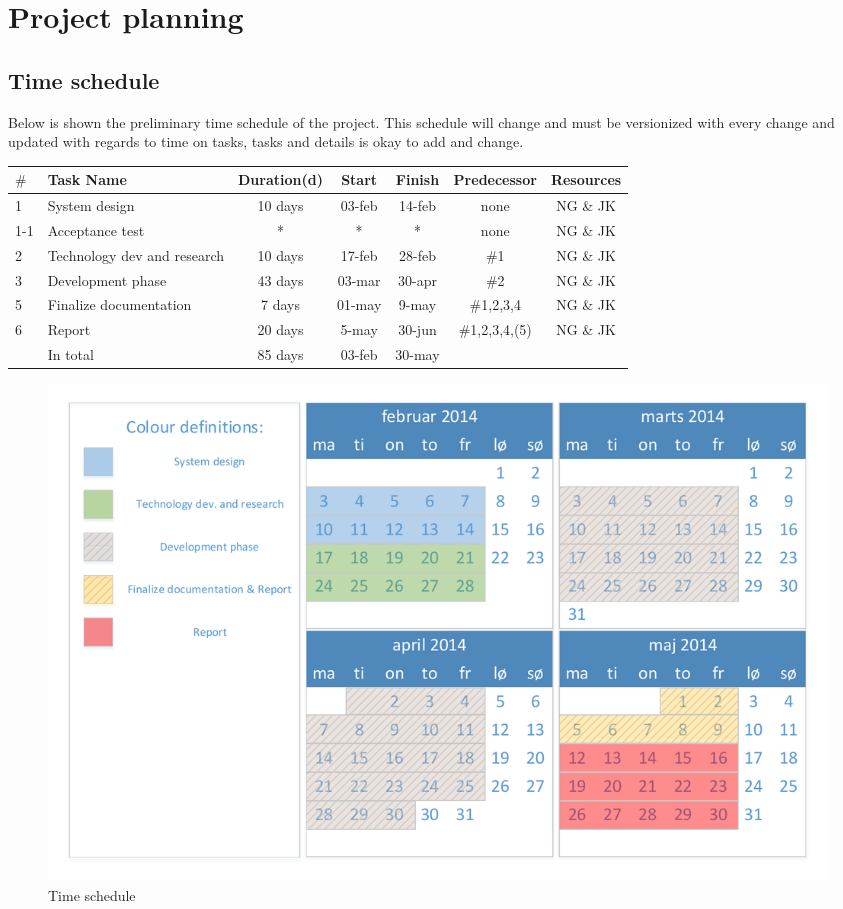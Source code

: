\chapter{Project planning}
\section{Time schedule}
Below is shown the preliminary time schedule of the project. This schedule will change and must be versionized with every change and updated with regards to time on tasks, tasks and details is okay to add and change.\\ 

\begin{table}[H]
\centering
\begin{tabular}{|l |p{4cm} |c |c |c |c |c|}
\hline 
$\#$ & Task Name & Duration(d) & Start & Finish & Predecessor & Resources \\ 
\hline 
1 & System design & 10 days & 03-feb & 14-feb & none & NG \& JK \\ 
\hline
1-1 & Acceptance test & * & * & * & none &  NG \& JK \\ 
\hline
2 & Technology dev and research & 10 days & 17-feb & 28-feb & $\#$1 & NG \& JK \\ 
\hline 
3 & Development phase & 43 days & 03-mar & 30-apr & $\#$2 & NG \& JK \\ 
\hline 
5 & Finalize documentation & 7 days & 01-may & 9-may & $\#$1,2,3,4 & NG \& JK \\ 
\hline 
6 & Report & 20 days & 5-may & 30-jun & $\#$1,2,3,4,(5) & NG \& JK \\ 
\hline \hline
~ & In total & 85 days & 03-feb & 30-may & ~ & ~ \\ 
\hline 
\end{tabular} 
\end{table}

\begin{figure}[H]
\centering
\includegraphics[width=.9\textwidth]{billeder/timeschedule_vector}
\caption{Time schedule}
\end{figure}

